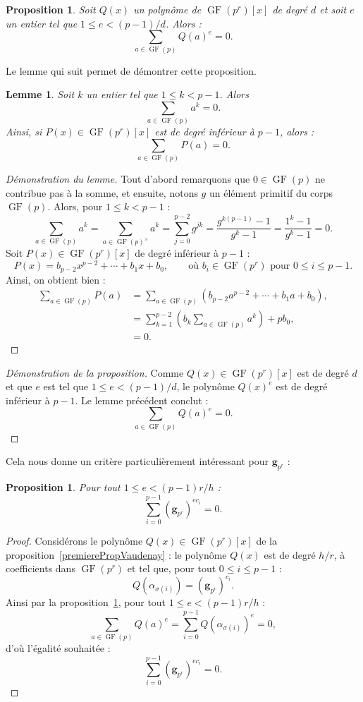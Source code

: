 \documentclass[a4paper, titlepage, 11pt]{article}
\newtheorem{lemm}[theo]{Lemme}
\newtheorem{prop}[theo]{Proposition}
\theoremstyle{definition}
\theoremstyle{remark}
\def\gf{\operatorname{GF}}
\def\mbf#1{\mathbf{#1}}
\begin{document}
\begin{prop}\label{prop:faitCool}
Soit $Q(x)$ un polynôme de $\gf(p^r)[x]$ de degré $d$ et soit $e$ un entier tel que $1 \leqslant e < (p-1)/d$. Alors : $$\sum_{a \in \gf(p)} Q(a)^e = 0.$$
\end{prop}

Le lemme qui suit permet de démontrer cette proposition.

\begin{lemm}
Soit $k$ un entier tel que $1 \leqslant k < p-1$. Alors
$$\sum_{a\in\gf(p)} a^k = 0.$$
Ainsi, si $P(x) \in \gf(p^r)[x]$ est de degré inférieur à $p-1$, alors : $$\sum_{a\in\gf(p)} P(a) = 0.$$
\end{lemm}

\begin{proof}[Démonstration du lemme]
Tout d'abord remarquons que $0 \in \gf(p)$ ne contribue pas à la somme, et ensuite, notons $g$ un élément primitif du corps $\gf(p)$. Alors, pour $1 \leqslant k < p-1$ :
$$\sum_{a\in\gf(p)} a^k = \sum_{a\in\gf(p)^\times} a^k = \sum_{j=0}^{p-2} g^{jk} = \frac{g^{k(p-1)} - 1}{g^{k} - 1} = \frac{1^{k} - 1}{g^{k} - 1} = 0.$$
Soit $P(x) \in \gf(p^r)[x]$ de degré inférieur à $p-1$ :
$$P(x) = b_{p-2}x^{p-2} + \cdots + b_1x + b_0, \qquad \text{où }b_i \in \gf(p^r) \text{ pour } 0 \leqslant i \leqslant p-1.$$
Ainsi, on obtient bien :
\begin{align*}
\sum_{a\in\gf(p)} P(a) &= \sum_{a\in\gf(p)} \left({b_{p-2}a^{p-2} + \cdots + b_1a + b_0}\right), \\
&= \sum_{k=1}^{p-2} \left({ b_k\sum_{a\in\gf(p)} a^k}\right) + pb_0, \\
&= 0.
\end{align*}
\end{proof}

\begin{proof}[Démonstration de la proposition]
Comme $Q(x) \in \gf(p^r)[x]$ est de degré $d$ et que $e$ est tel que $1\leqslant e < (p-1)/d$, le polynôme $Q(x)^e$ est de degré inférieur à $p-1$. Le lemme précédent conclut :
$$\sum_{a\in\gf(p)} Q(a)^e = 0.$$
\end{proof}

Cela nous donne un critère particulièrement intéressant pour $\mbf g_{p^r}$ :

\begin{prop}
Pour tout $1 \leqslant e < (p-1)r/h$ :
$$\sum_{i=0}^{p-1} (\mbf g_{p^r})^{ec_i} = 0.$$
\end{prop}

\begin{proof}
Considérons le polynôme $Q(x)\in\gf(p^r)[x]$ de la proposition~\ref{premierePropVaudenay} : le polynôme $Q(x)$ est de degré $h/r$, à coefficients dans $\gf(p^r)$ et tel que, pour tout $0 \leqslant i \leqslant p-1$ :
$$Q\left(\alpha_{\sigma(i)}\right) = (\mbf g_{p^r})^{c_i}.$$
Ainsi par la proposition~\ref{prop:faitCool}, pour tout $1 \leqslant e < (p-1)r/h$ :
$$\sum_{a\in\gf(p)} Q(a)^e = \sum_{i=0}^{p-1} Q\left(\alpha_{\sigma(i)}\right)^e = 0,$$
d'où l'égalité souhaitée :
$$\sum_{i=0}^{p-1} (\mbf g_{p^r})^{ec_i} = 0.$$
\end{proof}
\end{document}
